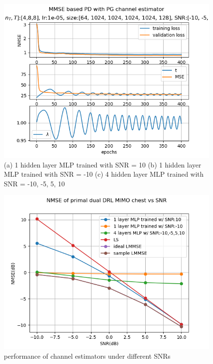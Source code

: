 \documentclass[journal,10pt,twocolumn]{IEEEtran}
\begin{document}
        \begin{figure}[h]
            \includegraphics[width=\linewidth]{figures/lr1e-05_[64, 1024, 1024, 1024, 1024, 128]_ep400_SNR_[-10, -5, 5, 10].png}
            \caption{(a) 1 hidden layer MLP trained with SNR = 10
                (b) 1 hidden layer MLP trained with SNR = -10
                (c) 4 hidden layer MLP trained with SNR = -10, -5, 5, 10}
            \label{fig:train_result}
        \end{figure}
        \begin{figure}[h]
            \includegraphics[width=\linewidth]{figures/3mlp_Chest_.png}
            \caption{performance of channel estimators under different SNRs}
            \label{fig:test_result}
        \end{figure}
\end{document}
